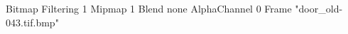 {Bitmap
	{Filtering 1}
	{Mipmap 1}
	{Blend none}
	{AlphaChannel 0}
	{Frame "door_old-043.tif.bmp"}
}

